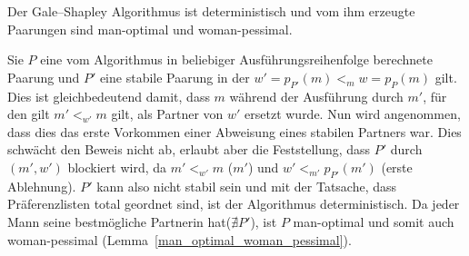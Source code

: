 \begin{Theorem}
\label{mann_optimal}
  Der Gale–Shapley Algorithmus ist deterministisch und vom ihm erzeugte Paarungen sind man-optimal und woman-pessimal.
\end{Theorem}

\begin{Beweis}
\label{mann_optimal_bew}
  Sie $P$ eine vom Algorithmus in beliebiger Ausführungsreihenfolge berechnete Paarung und $P'$ eine stabile Paarung in der $w' = p_{P'}(m) <_{m} w = p_{P}(m)$ gilt. Dies ist gleichbedeutend damit, dass $m$ während der Ausführung durch $m'$, für den gilt $m' <_{w'} m$ gilt, als Partner von $w'$ ersetzt wurde. Nun wird angenommen, dass dies das erste Vorkommen einer Abweisung eines stabilen Partners war. Dies schwächt den Beweis nicht ab, erlaubt aber die Feststellung, dass $P'$ durch $(m',w')$ blockiert wird, da $m' <_{w'} m$ ($m'$) und $w' <_{m'} p_{P'}(m')$ (erste Ablehnung). $P'$ kann also nicht stabil sein und mit der Tatsache, dass Präferenzlisten total geordnet sind, ist der Algorithmus deterministisch. Da jeder Mann seine bestmögliche Partnerin hat($\nexists P'$), ist $P$ man-optimal und somit auch woman-pessimal (Lemma~\ref{man_optimal_woman_pessimal}).
\end{Beweis}

